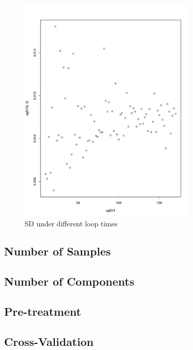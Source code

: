 \documentclass[a4paper,12pt,titlepage]{article} %
\numberwithin{equation}{section}  %
\begin{document}
	\begin{figure}[h]    %
	\centering           %
	\includegraphics[width=8.5cm, angle=0]{Number_of_loop_times_mp5-1.pdf}  %
	\vspace*{-0.25cm}    %
	\caption{SD under different loop times}          %
	\label{fig:looptimes}               %
\end{figure}                        %
	
	\subsection{Number of Samples}
	\label{sec:Number of Samples}
	
	\subsection{Number of Components}
	\label{sec:Number of Components}
	
	\subsection{Pre-treatment}
	\label{sec:Pre-treatment}
	
	\subsection{Cross-Validation}
	\label{sec:Cross-Validation}
	
\end{document}
